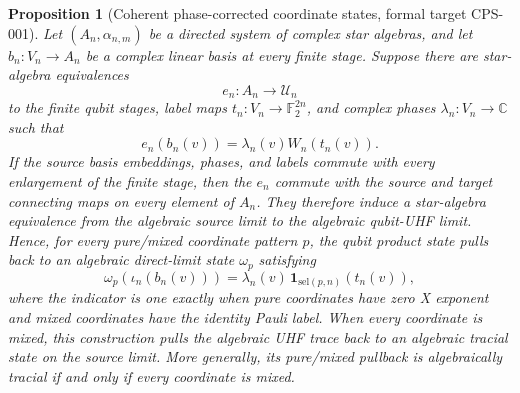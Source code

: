\documentclass{article}
\newtheorem{proposition}[definition]{Proposition}
\begin{document}
\begin{proposition}[Coherent phase-corrected coordinate states, formal target
CPS-001]
\label{prop:coherent_phase_coordinate_state}
Let $(A_n,\alpha_{n,m})$ be a directed system of complex star algebras, and
let $b_n:V_n\to A_n$ be a complex linear basis at every finite stage.  Suppose
there are star-algebra equivalences
\begin{equation*}
  e_n:A_n\longrightarrow \mathcal U_n
\end{equation*}
to the finite qubit stages, label maps $t_n:V_n\to\mathbb F_2^{2n}$, and
complex phases $\lambda_n:V_n\to\mathbb C$ such that
\begin{equation*}
  e_n(b_n(v))=\lambda_n(v)W_n(t_n(v)).
\end{equation*}
If the source basis embeddings, phases, and labels commute with every
enlargement of the finite stage, then the $e_n$ commute with the source and
target connecting maps on every element of $A_n$.  They therefore induce a
star-algebra equivalence from the algebraic source limit to the algebraic
qubit-UHF limit.  Hence, for every pure/mixed coordinate pattern $p$, the
qubit product state pulls back to an algebraic direct-limit state $\omega_p$
satisfying
\begin{equation*}
  \omega_p(\iota_n(b_n(v)))
  =\lambda_n(v)\,\mathbf 1_{\mathrm{sel}(p,n)}(t_n(v)),
\end{equation*}
where the indicator is one exactly when pure coordinates have zero X exponent
and mixed coordinates have the identity Pauli label.  When every coordinate is
mixed, this construction pulls the algebraic UHF trace back to an algebraic
tracial state on the source limit.  More generally, its pure/mixed pullback is
algebraically tracial if and only if every coordinate is mixed.
\end{proposition}
\end{document}

